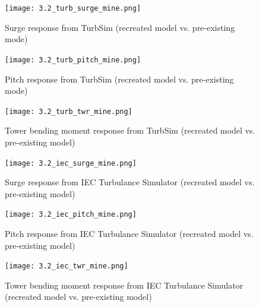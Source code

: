 \documentclass[a4paper, 11pt]{article}
\begin{document}
\begin{figure}[H]
    \begin{minipage}{0.48\textwidth}
        \centering
        \texttt{[image: 3.2\_turb\_surge\_mine.png]}
        \caption{\small Surge response from TurbSim (recreated model vs. pre-existing mode)}
        \label{fig:3.2_turb_surge_mine_recreated}
    \end{minipage}
    \hfill
    \begin{minipage}{0.5\textwidth}
        \centering
        \texttt{[image: 3.2\_turb\_pitch\_mine.png]}
        \caption{\small Pitch response from TurbSim (recreated model vs. pre-existing mode)}
        \label{fig:3.2_turb_pitch_mine_recreated}
    \end{minipage}
\end{figure}

\begin{figure}[H]
    \begin{minipage}{0.48\textwidth}
        \centering
        \texttt{[image: 3.2\_turb\_twr\_mine.png]}
        \caption{\small Tower bending moment response from TurbSim (recreated model vs. pre-existing model)}
        \label{fig:3.2_turb_twr_mine_recreated}
    \end{minipage}
    \hfill
    \begin{minipage}{0.5\textwidth}
        \centering
        \texttt{[image: 3.2\_iec\_surge\_mine.png]}
        \caption{\small Surge response from IEC Turbulance Simulator (recreated model vs. pre-existing model)}
        \label{fig:3.2_iec_surge_mine_recreated}
    \end{minipage}
\end{figure}

\begin{figure}[H]
    \begin{minipage}{0.48\textwidth}
        \centering
        \texttt{[image: 3.2\_iec\_pitch\_mine.png]}
        \caption{\small Pitch response from IEC Turbulance Simulator (recreated model vs. pre-existing model)}
        \label{fig:3.2_iec_pitch_mine_recreated}
    \end{minipage}
    \hfill
    \begin{minipage}{0.5\textwidth}
        \centering
        \texttt{[image: 3.2\_iec\_twr\_mine.png]}
        \caption{\small Tower bending moment response from IEC Turbulance Simulator (recreated model vs. pre-existing model)}
        \label{fig:3.2_iec_twr_mine_recreated}
    \end{minipage}
\end{figure}
\end{document}
